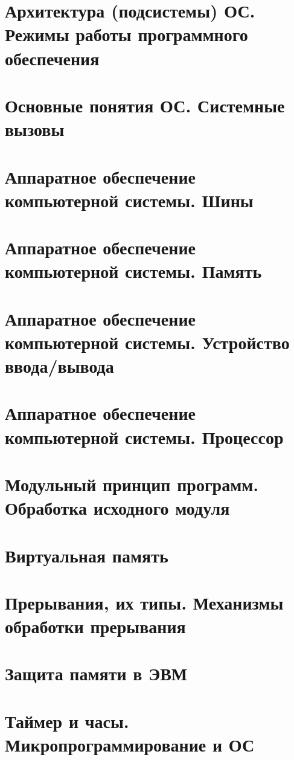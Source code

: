 \documentclass[a5paper, 10pt, notitlepage, pdftex,headsepline]{scrartcl}
\begin{document}
\section{Архитектура (подсистемы) ОС. Режимы работы программного обеспечения}
\section{Основные понятия ОС. Системные вызовы}
\section{Аппаратное обеспечение компьютерной системы. Шины}
\section{Аппаратное обеспечение компьютерной системы. Память}
\section{Аппаратное обеспечение компьютерной системы. Устройство ввода/вывода}
\section{Аппаратное обеспечение компьютерной системы. Процессор}
\section{Модульный принцип программ. Обработка исходного модуля}
\section{Виртуальная память}
\section{Прерывания, их типы. Механизмы обработки прерывания}
\section{Защита памяти в ЭВМ}
\section{Таймер и часы. Микропрограммирование и ОС}
\end{document}
